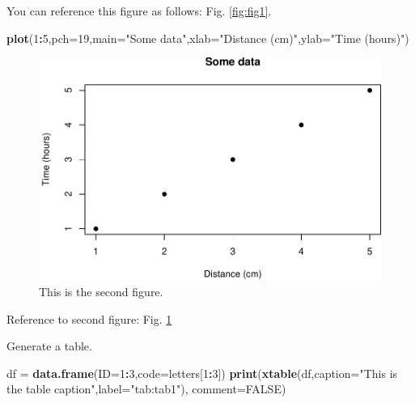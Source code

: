 \documentclass[12pt,halfline,a4paper,]{ouparticle}
\newenvironment{Shaded}{\begin{snugshade}}{\end{snugshade}}
\newcommand{\DataTypeTok}[1]{\textcolor[rgb]{0.13,0.29,0.53}{#1}}
\newcommand{\DecValTok}[1]{\textcolor[rgb]{0.00,0.00,0.81}{#1}}
\newcommand{\KeywordTok}[1]{\textcolor[rgb]{0.13,0.29,0.53}{\textbf{#1}}}
\newcommand{\NormalTok}[1]{#1}
\newcommand{\OperatorTok}[1]{\textcolor[rgb]{0.81,0.36,0.00}{\textbf{#1}}}
\newcommand{\OtherTok}[1]{\textcolor[rgb]{0.56,0.35,0.01}{#1}}
\newcommand{\StringTok}[1]{\textcolor[rgb]{0.31,0.60,0.02}{#1}}
\begin{document}
You can reference this figure as follows: Fig. \ref{fig:fig1}.

\begin{Shaded}
\begin{Highlighting}[]
\KeywordTok{plot}\NormalTok{(}\DecValTok{1}\OperatorTok{:}\DecValTok{5}\NormalTok{,}\DataTypeTok{pch=}\DecValTok{19}\NormalTok{,}\DataTypeTok{main=}\StringTok{"Some data"}\NormalTok{,}\DataTypeTok{xlab=}\StringTok{"Distance (cm)"}\NormalTok{,}\DataTypeTok{ylab=}\StringTok{"Time (hours)"}\NormalTok{)}
\end{Highlighting}
\end{Shaded}

\begin{figure}[p]
\includegraphics[width=1\linewidth]{manuscript_reaction_times_2020_files/figure-latex/fig2-1} \caption{This is the second figure.}\label{fig:fig2}
\end{figure}

Reference to second figure: Fig. \ref{fig:fig2}

Generate a table.

\begin{Shaded}
\begin{Highlighting}[]
\NormalTok{df =}\StringTok{ }\KeywordTok{data.frame}\NormalTok{(}\DataTypeTok{ID=}\DecValTok{1}\OperatorTok{:}\DecValTok{3}\NormalTok{,}\DataTypeTok{code=}\NormalTok{letters[}\DecValTok{1}\OperatorTok{:}\DecValTok{3}\NormalTok{])}
\KeywordTok{print}\NormalTok{(}\KeywordTok{xtable}\NormalTok{(df,}\DataTypeTok{caption=}\StringTok{"This is the table caption"}\NormalTok{,}\DataTypeTok{label=}\StringTok{"tab:tab1"}\NormalTok{),}
      \DataTypeTok{comment=}\OtherTok{FALSE}\NormalTok{)}
\end{Highlighting}
\end{Shaded}
\end{document}
